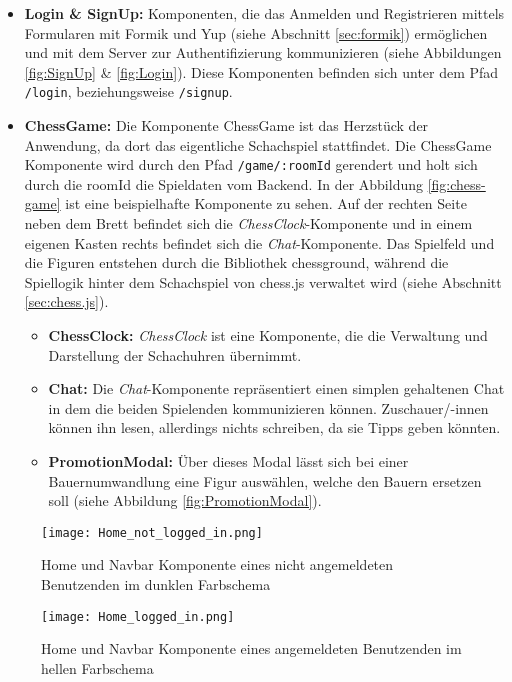 \begin{itemize}
\item \textbf{Login \& SignUp:} Komponenten, die das Anmelden und Registrieren mittels Formularen mit Formik und Yup (siehe Abschnitt \ref{sec:formik}) ermöglichen und mit dem Server zur Authentifizierung kommunizieren (siehe Abbildungen \ref{fig:SignUp} \& \ref{fig:Login}). Diese Komponenten befinden sich unter dem Pfad \verb|/login|, beziehungsweise \verb|/signup|.
\item \textbf{ChessGame:} Die Komponente ChessGame ist das Herzstück der Anwendung, da dort das eigentliche Schachspiel stattfindet. Die ChessGame Komponente wird durch den Pfad \verb|/game/:roomId| gerendert und holt sich durch die roomId die Spieldaten vom Backend. In der Abbildung \ref{fig:chess-game} ist eine beispielhafte Komponente zu sehen. Auf der rechten Seite neben dem Brett befindet sich die \textit{ChessClock}-Komponente und in einem eigenen Kasten rechts befindet sich die \textit{Chat}-Komponente. Das Spielfeld und die Figuren entstehen durch die Bibliothek chessground, während die Spiellogik hinter dem Schachspiel von chess.js verwaltet wird (siehe Abschnitt \ref{sec:chess.js}).

\begin{itemize}
\item \textbf{ChessClock:} \textit{ChessClock} ist eine Komponente, die die Verwaltung und Darstellung der Schachuhren übernimmt.
\item \textbf{Chat:} Die \textit{Chat}-Komponente repräsentiert einen simplen gehaltenen Chat in dem die beiden Spielenden kommunizieren können. Zuschauer/-innen können ihn lesen, allerdings nichts schreiben, da sie Tipps geben könnten.
\item \textbf{PromotionModal:} Über dieses Modal lässt sich bei einer Bauernumwandlung eine Figur auswählen, welche den Bauern ersetzen soll (siehe Abbildung \ref{fig:PromotionModal}).
\end{itemize}
\end{itemize}



  \begin{figure}[htbp]
  \centering
  \texttt{[image: Home\_not\_logged\_in.png]}
  \caption{Home und Navbar Komponente eines nicht angemeldeten Benutzenden im dunklen Farbschema}
  \label{fig:home-not-logged-in}
\end{figure}

  
    \begin{figure}[htbp]
    \centering
  \texttt{[image: Home\_logged\_in.png]}
  \caption{Home und Navbar Komponente eines angemeldeten Benutzenden im hellen Farbschema}
  \label{fig:home-logged-in}
\end{figure}

